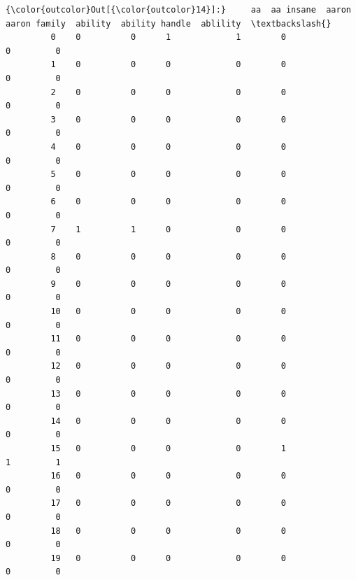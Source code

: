 \documentclass[11pt]{article}
\begin{document}
\begin{Verbatim}[commandchars=\\\{\}]
{\color{outcolor}Out[{\color{outcolor}14}]:}     aa  aa insane  aaron  aaron family  ability  ability handle  ablility  \textbackslash{}
         0    0          0      1             1        0               0         0   
         1    0          0      0             0        0               0         0   
         2    0          0      0             0        0               0         0   
         3    0          0      0             0        0               0         0   
         4    0          0      0             0        0               0         0   
         5    0          0      0             0        0               0         0   
         6    0          0      0             0        0               0         0   
         7    1          1      0             0        0               0         0   
         8    0          0      0             0        0               0         0   
         9    0          0      0             0        0               0         0   
         10   0          0      0             0        0               0         0   
         11   0          0      0             0        0               0         0   
         12   0          0      0             0        0               0         0   
         13   0          0      0             0        0               0         0   
         14   0          0      0             0        0               0         0   
         15   0          0      0             0        1               1         1   
         16   0          0      0             0        0               0         0   
         17   0          0      0             0        0               0         0   
         18   0          0      0             0        0               0         0   
         19   0          0      0             0        0               0         0   
         

\end{Verbatim}
\end{document}
